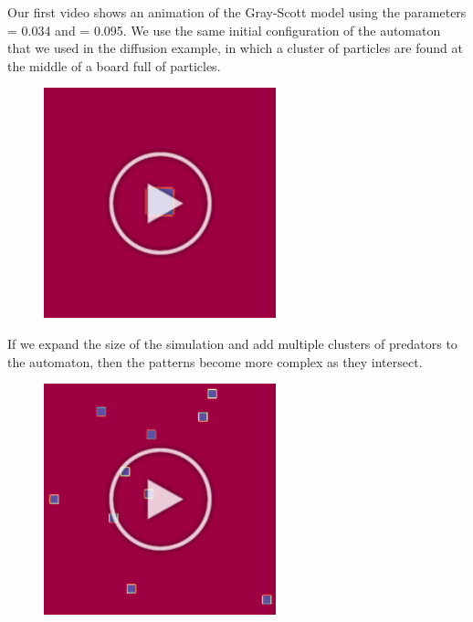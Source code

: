 {{Our first video shows an animation of the Gray-Scott model using the parameters  = 0.034 and  = 0.095. We use the same initial configuration of the automaton that we used in the diffusion example, in which a cluster of  particles are found at the middle of a board full of  particles.

\begin{figure}[h]
\centering
\mySfFamily
\includegraphics[width = 0.6\textwidth]{../images/gray-scott_movie_first_frame.png}
\caption{}
\label{fig:gray-scott_movie_first_frame}
\end{figure}

If we expand the size of the simulation and add multiple clusters of predators to the automaton, then the patterns become more complex as they intersect.

\begin{figure}[h]
\centering
\mySfFamily
\includegraphics[width = 0.6\textwidth]{../images/gray-scott_multiple_predators_first_frame.png}
\caption{}
\label{fig:gray-scott_multiple_predators_first_frame}
\end{figure}

}}
